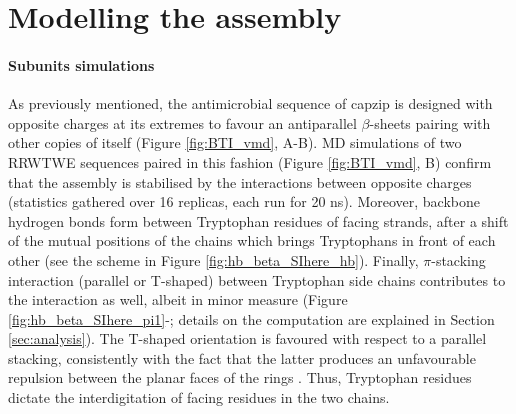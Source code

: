 \section{Modelling the assembly} \label{sec:build}

\paragraph{Subunits simulations} As previously mentioned, the antimicrobial sequence of capzip is designed with opposite charges at its extremes to favour an antiparallel $\beta$-sheets pairing with other copies of itself (Figure \ref{fig:BTI_vmd}, A-B).
%
MD simulations of two RRWTWE sequences paired in this fashion (Figure \ref{fig:BTI_vmd}, B) confirm that the assembly is stabilised by the interactions between opposite charges (statistics gathered over 16 replicas, each run for 20 ns).
%
Moreover, backbone hydrogen bonds form between Tryptophan residues of facing strands, after a shift of the mutual positions of the chains which brings Tryptophans in front of each other (see the scheme in Figure \ref{fig:hb_beta_SIhere_hb}).
%
Finally, $\pi$-stacking interaction (parallel or T-shaped) between Tryptophan side chains contributes to the interaction as well, albeit in minor measure (Figure \ref{fig:hb_beta_SIhere_pi1}-; details on the computation are explained in Section \ref{sec:analysis}). The T-shaped orientation is favoured with respect to a parallel stacking, consistently with the fact that the latter produces an unfavourable repulsion between the planar faces of the rings \citep{Hunter2001}.  
%
Thus, Tryptophan residues dictate the interdigitation of facing residues in the two chains.
%
